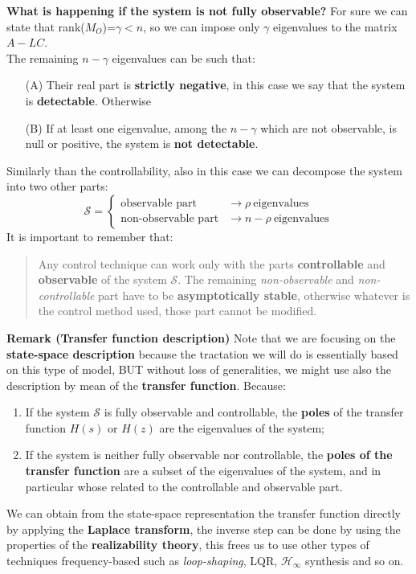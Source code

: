 \vspace{0.2cm}
\noindent
\textbf{What is happening if the system is not fully observable?} For sure we can state that rank($M_O$)=$\gamma<n$, so we can impose only $\gamma$ eigenvalues to the matrix $A-LC$. \\
The remaining $n-\gamma$ eigenvalues can be such that:
\begin{itemize}
    \item[(A)] Their real part is \textbf{strictly negative}, in this case we say that the system is {\color{red}\textbf{detectable}}. Otherwise
    \item[(B)] If at least one eigenvalue, among the $n-\gamma$ which are not observable, is null or positive, the system is \textbf{not detectable}.
\end{itemize} 
Similarly than the controllability, also in this case we can decompose the system into two other parts:
{\large{
    \begin{equation*}
        \mathcal{S}=\begin{cases}
            \text{observable part }&\to {\rho \ \text{eigenvalues}}\\
            \text{non-observable part}&\to {n-\rho \ \text{eigenvalues}}
        \end{cases}
    \end{equation*}
}}
\noindent
It is important to remember that:
\begin{quote}
    \color{red}
    Any control technique can work only with the parts \textbf{controllable} and \textbf{observable} of the system $\mathcal{S}$. The remaining \textit{non-observable} and \textit{non-controllable} part have to be \textbf{asymptotically stable}, otherwise whatever is the control method used, those part cannot be modified.
\end{quote}



\noindent
{\color{blue}\textbf{Remark (Transfer function description)}}  Note that we are focusing on the \textbf{state-space description} because the tractation we will do is essentially based on this type of model, BUT without loss of generalities, we might use also the description by mean of the \textbf{transfer function}. Because:
\begin{enumerate}
    \item If the system $\mathcal{S}$ is fully observable and controllable, the \textbf{poles} of the transfer function $H(s)$ or $H(z)$ are the eigenvalues of the system;
    \item If the system is neither fully observable nor controllable, the \textbf{poles of the transfer function} are a subset of the eigenvalues of the system, and in particular whose related to the controllable and observable part.
\end{enumerate}
We can obtain from the state-space representation the transfer function directly by applying the \textbf{Laplace transform}, the inverse step can be done by using the properties of the \textbf{realizability theory}, this frees us to use other types of techniques frequency-based  such as \textit{loop-shaping}, LQR, $\mathcal{H}_\infty$ synthesis and so on.

